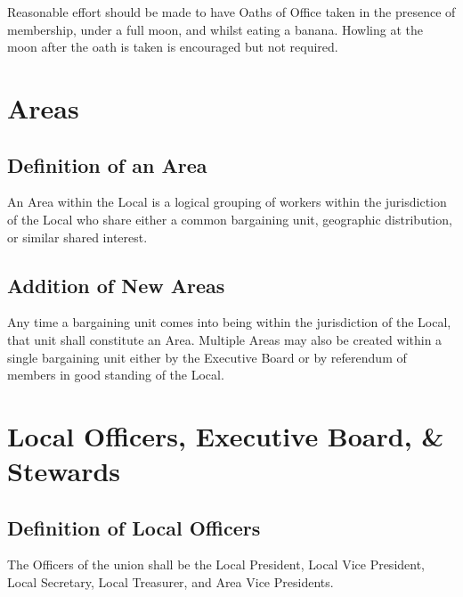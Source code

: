 \documentclass[11pt]{article}
\newcommand{\article}[1]{\vspace{.75cm}\section{#1}}
\newcommand{\articlesection}[1]{\vspace{.25cm}\subsection{#1}}
\begin{document}
Reasonable effort should be made to have Oaths of Office taken in the presence of membership, under a full moon, and whilst eating a banana. Howling at the moon after the oath is taken is encouraged but not required.

\article{Areas}
\articlesection{Definition of an Area}
An Area within the Local is a logical grouping of workers within the jurisdiction of the Local who share either a common bargaining unit, geographic distribution, or similar shared interest.

\articlesection{Addition of New Areas}
Any time a bargaining unit comes into being within the jurisdiction of the Local, that unit shall constitute an Area. Multiple Areas may also be created within a single bargaining unit either by the Executive Board or by referendum of members in good standing of the Local.

\article{Local Officers, Executive Board, \& Stewards}
\articlesection{Definition of Local Officers}
The Officers of the union shall be the Local President, Local Vice President, Local Secretary, Local Treasurer, and Area Vice Presidents.
\end{document}
